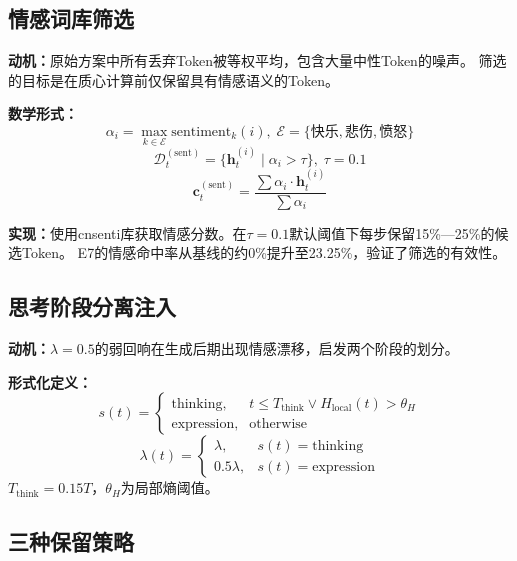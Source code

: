 \documentclass[a4paper, 11pt]{article}
\begin{document}
\subsection{情感词库筛选}

\textbf{动机：}原始方案中所有丢弃Token被等权平均，包含大量中性Token的噪声。
筛选的目标是在质心计算前仅保留具有情感语义的Token。

\textbf{数学形式：}
\begin{equation}
  \alpha_i=\max_{k\in\mathcal{E}} \text{sentiment}_k(i),\;
  \mathcal{E}=\{\text{快乐},\text{悲伤},\text{愤怒}\}
\end{equation}
\begin{equation}
  \mathcal{D}_t^{(\text{sent})}=\{\bm{h}_t^{(i)}\mid\alpha_i>\tau\},\;\tau=0.1
\end{equation}
\begin{equation}
  \bm{c}_t^{(\text{sent})}=\frac{\sum\alpha_i\cdot\bm{h}_t^{(i)}}{\sum\alpha_i}
\end{equation}

\textbf{实现：}使用cnsenti库获取情感分数。在$\tau=0.1$默认阈值下每步保留15\%---25\%的候选Token。
E7的情感命中率从基线的约0\%提升至23.25\%，验证了筛选的有效性。

\subsection{思考阶段分离注入}

\textbf{动机：}$\lambda=0.5$的弱回响在生成后期出现情感漂移，启发两个阶段的划分。

\textbf{形式化定义：}
\begin{equation}
  s(t)=\begin{cases}\text{thinking},& t\le T_{\text{think}} \lor H_{\text{local}}(t)>\theta_H\\\text{expression},& \text{otherwise}\end{cases}
\end{equation}
\begin{equation}
  \lambda(t)=\begin{cases}\lambda, & s(t)=\text{thinking}\\0.5\lambda, & s(t)=\text{expression}\end{cases}
\end{equation}
$T_{\text{think}}=0.15T$，$\theta_H$为局部熵阈值。

\subsection{三种保留策略}
\end{document}
